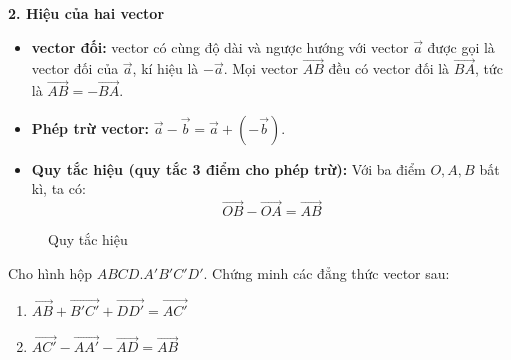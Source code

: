 \documentclass[12pt]{article}
\begin{document}
	\vspace{0.5cm}
	\textbf{2. Hiệu của hai vector}
	\begin{itemize}
		\item \textbf{vector đối:} vector có cùng độ dài và ngược hướng với vector $\vec{a}$ được gọi là vector đối của $\vec{a}$, kí hiệu là $-\vec{a}$. Mọi vector $\overrightarrow{AB}$ đều có vector đối là $\overrightarrow{BA}$, tức là $\overrightarrow{AB} = -\overrightarrow{BA}$.
		\item \textbf{Phép trừ vector:} $\vec{a} - \vec{b} = \vec{a} + (-\vec{b})$.
		\item \textbf{Quy tắc hiệu (quy tắc 3 điểm cho phép trừ):} Với ba điểm $O, A, B$ bất kì, ta có:
		$$ \overrightarrow{OB} - \overrightarrow{OA} = \overrightarrow{AB} $$
	\end{itemize}
	
	\begin{figure}[H]
		\centering
		\caption{Quy tắc hiệu}
	\end{figure}
	
	\begin{vidu}[2]
		Cho hình hộp $ABCD.A'B'C'D'$. Chứng minh các đẳng thức vector sau:
		\begin{enumerate}[label=\alph*)]
			\item $\overrightarrow{AB} + \overrightarrow{B'C'} + \overrightarrow{DD'} = \overrightarrow{AC'}$
			\item $\overrightarrow{AC'} - \overrightarrow{AA'} - \overrightarrow{AD} = \overrightarrow{AB}$
		\end{enumerate}
	\end{vidu}
	
\end{document}
